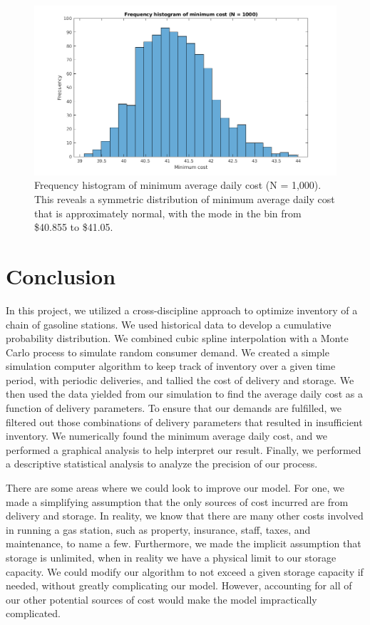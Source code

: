 \documentclass{article}
\begin{document}
    \begin{figure}[h]
        \centering
        \includegraphics[width=\textwidth]{img/histogram.png}
        \caption{Frequency histogram of minimum average daily cost (N = 1,000). This reveals a symmetric distribution of minimum average daily cost that is approximately normal, with the mode in the bin from \$40.855 to \$41.05.}
        \label{fig:histogram}
    \end{figure}
    \pagebreak
    \section*{Conclusion}
    In this project, we utilized a cross-discipline approach to optimize inventory of a chain of gasoline stations. We used historical data to develop a cumulative probability distribution. We combined cubic spline interpolation with a Monte Carlo process to simulate random consumer demand. We created a simple simulation computer algorithm to keep track of inventory over a given time period, with periodic deliveries, and tallied the cost of delivery and storage. We then used the data yielded from our simulation to find the average daily cost as a function of delivery parameters. To ensure that our demands are fulfilled, we filtered out those combinations of delivery parameters that resulted in insufficient inventory. We numerically found the minimum average daily cost, and we performed a graphical analysis to help interpret our result. Finally, we performed a descriptive statistical analysis to analyze the precision of our process.

    There are some areas where we could look to improve our model. For one, we made a simplifying assumption that the only sources of cost incurred are from delivery and storage. In reality, we know that there are many other costs involved in running a gas station, such as property, insurance, staff, taxes, and maintenance, to name a few. Furthermore, we made the implicit assumption that storage is unlimited, when in reality we have a physical limit to our storage capacity. We could modify our algorithm to not exceed a given storage capacity if needed, without greatly complicating our model. However, accounting for all of our other potential sources of cost would make the model impractically complicated.
\end{document}
